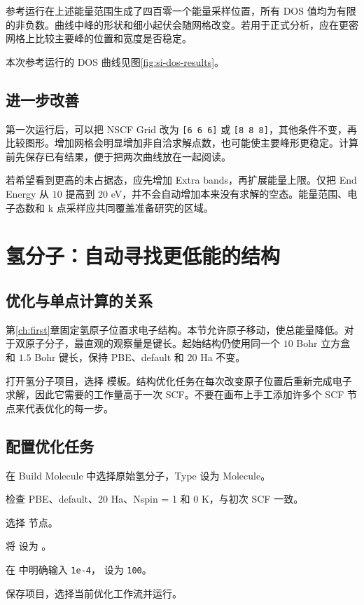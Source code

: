 参考运行在上述能量范围生成了四百零一个能量采样位置，所有 DOS 值均为有限的非负数。曲线中峰的形状和细小起伏会随网格改变。若用于正式分析，应在更密网格上比较主要峰的位置和宽度是否稳定。

本次参考运行的 DOS 曲线见图\ref{fig:si-dos-results}。

\subsection{进一步改善 }

第一次运行后，可以把 NSCF Grid 改为 \texttt{[6 6 6]} 或 \texttt{[8 8 8]}，其他条件不变，再比较图形。增加网格会明显增加非自洽求解点数，也可能使主要峰形更稳定。计算前先保存已有结果，便于把两次曲线放在一起阅读。

若希望看到更高的未占据态，应先增加 Extra bands，再扩展能量上限。仅把 End Energy 从 $10$ 提高到 $20$ eV，并不会自动增加本来没有求解的空态。能量范围、电子态数和 k 点采样应共同覆盖准备研究的区域。

\section{氢分子：自动寻找更低能的结构}

\subsection{优化与单点计算的关系}

第\ref{ch:first}章固定氢原子位置求电子结构。本节允许原子移动，使总能量降低。对于双原子分子，最直观的观察量是键长。起始结构仍使用同一个 $10$ Bohr 立方盒和 $1.5$ Bohr 键长，保持 PBE、default 和 $20$ Ha 不变。

打开氢分子项目，选择  模板。结构优化任务在每次改变原子位置后重新完成电子求解，因此它需要的工作量高于一次 SCF。不要在画布上手工添加许多个 SCF 节点来代表优化的每一步。

\subsection{配置优化任务}

\begin{steps}
\item 在 Build Molecule 中选择原始氢分子，Type 设为 Molecule。
\item 检查 PBE、default、20 Ha、Nspin = 1 和 0 K，与初次 SCF 一致。
\item 选择  节点。
\item 将  设为 。
\item 在  中明确输入 \texttt{1e-4}， 设为 \texttt{100}。
\item 保存项目，选择当前优化工作流并运行。
\end{steps}

